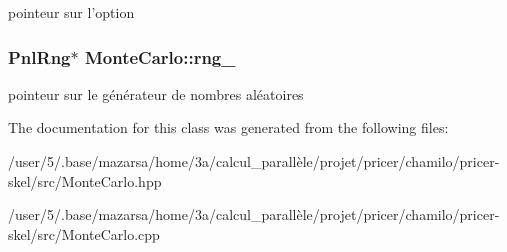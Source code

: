 pointeur sur l'option \hypertarget{classMonteCarlo_aa41318b565311457e04383047d68936e}{
\subsubsection[{rng\-\_\-}]{\setlength{\rightskip}{0pt plus 5cm}Pnl\-Rng$\ast$ Monte\-Carlo\-::rng\-\_\-}}\label{classMonteCarlo_aa41318b565311457e04383047d68936e}
pointeur sur le générateur de nombres aléatoires 

The documentation for this class was generated from the following files\-:\begin{DoxyCompactItemize}
\item 
/user/5/.\-base/mazarsa/home/3a/calcul\-\_\-parallèle/projet/pricer/chamilo/pricer-\/skel/src/Monte\-Carlo.\-hpp\item 
/user/5/.\-base/mazarsa/home/3a/calcul\-\_\-parallèle/projet/pricer/chamilo/pricer-\/skel/src/Monte\-Carlo.\-cpp\end{DoxyCompactItemize}

